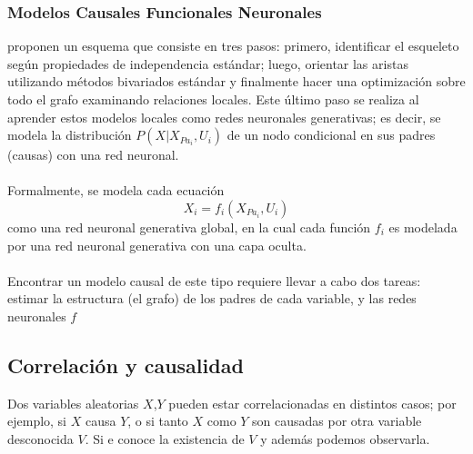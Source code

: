 \documentclass[11pt]{article}
\theoremstyle{plain}
\begin{document}
\subsubsection{Modelos Causales Funcionales Neuronales}
\cite{goudet2017learning} proponen un esquema que consiste en tres pasos: primero, identificar el esqueleto según propiedades de independencia estándar; luego, orientar las aristas utilizando métodos bivariados estándar y finalmente hacer una optimización sobre todo el grafo examinando relaciones locales. Este último paso se realiza al aprender estos modelos locales como redes neuronales generativas; es decir, se modela la distribución $P(X | X_{Pa_i}, U_i)$ de un nodo condicional en sus padres (causas) con una red neuronal.\\
\\
Formalmente, se modela cada ecuación
\[X_i = f_i (X_{Pa_i},U_i) \]
como una red neuronal generativa global, en la cual cada función $f_i$ es modelada por una red neuronal generativa con una capa oculta.\\
\\
Encontrar un modelo causal de este tipo requiere llevar a cabo dos tareas: estimar la estructura (el grafo) de los padres de cada variable, y las redes neuronales $f$
\subsection{Correlación y causalidad}
Dos variables aleatorias $X$,$Y$ pueden estar correlacionadas en distintos casos; por ejemplo, si $X$ causa $Y$, o si tanto $X$ como $Y$ son causadas por otra variable desconocida $V$. Si e conoce la existencia de $V$ y además podemos observarla. 
\end{document}
